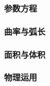 \documentclass[
]{article}
\begin{document}
\hypertarget{ux53c2ux6570ux65b9ux7a0b}{%
\subsubsection{参数方程}\label{ux53c2ux6570ux65b9ux7a0b}}

\hypertarget{ux66f2ux7387ux4e0eux5f27ux957f}{%
\subsubsection{曲率与弧长}\label{ux66f2ux7387ux4e0eux5f27ux957f}}

\hypertarget{ux9762ux79efux4e0eux4f53ux79ef}{%
\subsubsection{面积与体积}\label{ux9762ux79efux4e0eux4f53ux79ef}}

\hypertarget{ux7269ux7406ux8fd0ux7528}{%
\subsubsection{物理运用}\label{ux7269ux7406ux8fd0ux7528}}
\end{document}
